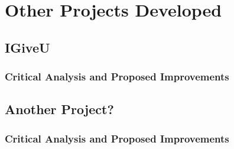 

\chapter{Other Projects Developed}
\label{ch:projects}

\section{IGiveU}

\subsection{Critical Analysis and Proposed Improvements}

\section{Another Project?}

\subsection{Critical Analysis and Proposed Improvements}